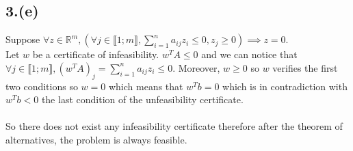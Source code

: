 \documentclass{article}
\begin{document}
\subsection*{3.(e)}
Suppose $\forall z\in \mathbb{R}^m, (\forall j \in \llbracket 1;m\rrbracket, \sum\limits_{i=1}^n a_{ij}z_i \leq 0, z_j\ge 0 ) \implies z = 0$.
\\
Let $w$ be a certificate of infeasibility. $w^TA \leq 0$ and we can notice that $\forall j \in \llbracket 1;m\rrbracket ,(w^TA)_j = \sum\limits_{i=1}^n a_{ij}z_i\leq 0$. Moreover, $w\ge 0$ so $w$ verifies the first two conditions so $w=0$ which means that $w^Tb = 0$ which is in contradiction with $w^Tb<0$ the last condition of the unfeasibility certificate.
\\\\
So there does not exist any infeasibility certificate therefore after the theorem of alternatives, the problem is always feasible.
\end{document}
